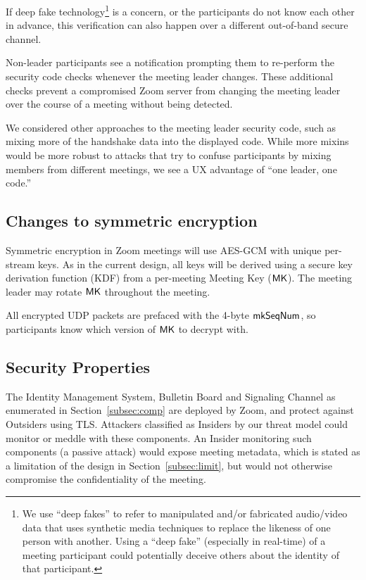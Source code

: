 If deep fake technology\footnote{We use ``deep fakes'' to refer to manipulated and/or fabricated audio/video data that uses synthetic media techniques to replace the likeness of one person with another. Using a ``deep fake'' (especially in real-time) of a meeting participant could potentially deceive others about the identity of that participant.} is a concern, or the participants do not know each other in advance, this verification can also happen over a different out-of-band secure channel.

Non-leader participants see a notification prompting them to re-perform the security code checks
whenever the meeting leader changes. These additional checks prevent a compromised Zoom server from
changing the meeting leader over the course of a meeting without being detected.

We considered other approaches to the meeting leader security code, such as mixing more of the handshake data into the displayed code. While more mixins would be more robust to attacks that try to confuse participants by mixing members from different meetings, we see a UX advantage of ``one leader, one code.''

\subsection{Changes to symmetric encryption}
Symmetric encryption in Zoom meetings will use AES-GCM with unique per-stream keys. As in the current design, all keys will be derived using a secure key derivation function (KDF) from a per-meeting Meeting Key (${\sf MK}$). The meeting leader may rotate ${\sf MK}$ throughout the meeting.

All encrypted UDP packets are prefaced with the 4-byte $\mathsf{mkSeqNum}$, so participants know which version of ${\sf MK}$ to decrypt with.

\subsection{Security Properties}
\label{subsec:secprop}
The Identity Management System, Bulletin Board and Signaling Channel as enumerated in
Section~\ref{subsec:comp} are deployed by Zoom, and protect against Outsiders using TLS. Attackers
classified as Insiders by our threat model could monitor or meddle with these components. An Insider
monitoring such components (a passive attack) would expose meeting metadata, which is stated as a
limitation of the design in Section~\ref{subsec:limit}, but would not otherwise compromise the
confidentiality of the meeting.

